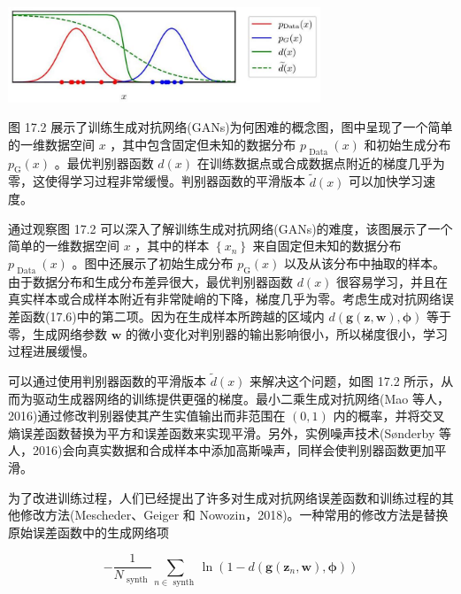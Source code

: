 \documentclass[10pt]{report}
\begin{document}
\begin{center}
\includegraphics[max width=0.7\textwidth]{images/0194e279-9b28-703a-88f4-c3ac21e2010d_556_553_347_918_280_0.jpg}
\end{center}
\hspace*{3em} 

图 17.2 展示了训练生成对抗网络(GANs)为何困难的概念图，图中呈现了一个简单的一维数据空间 \(x\) ，其中包含固定但未知的数据分布 \({p}_{\text{ Data }}\left( x\right)\) 和初始生成分布 \({p}_{\mathrm{G}}\left( x\right)\) 。最优判别器函数 \(d\left( x\right)\) 在训练数据点或合成数据点附近的梯度几乎为零，这使得学习过程非常缓慢。判别器函数的平滑版本 \(\widetilde{d}\left( x\right)\) 可以加快学习速度。

通过观察图 17.2 可以深入了解训练生成对抗网络(GANs)的难度，该图展示了一个简单的一维数据空间 \(x\) ，其中的样本 \(\left\{  {x}_{n}\right\}\) 来自固定但未知的数据分布 \({p}_{\text{ Data }}\left( x\right)\) 。图中还展示了初始生成分布 \({p}_{\mathrm{G}}\left( x\right)\) 以及从该分布中抽取的样本。由于数据分布和生成分布差异很大，最优判别器函数 \(d\left( x\right)\) 很容易学习，并且在真实样本或合成样本附近有非常陡峭的下降，梯度几乎为零。考虑生成对抗网络误差函数(17.6)中的第二项。因为在生成样本所跨越的区域内 \(d\left( {\mathbf{g}\left( {\mathbf{z},\mathbf{w}}\right) ,\mathbf{\phi }}\right)\) 等于零，生成网络参数 \(\mathbf{w}\) 的微小变化对判别器的输出影响很小，所以梯度很小，学习过程进展缓慢。

可以通过使用判别器函数的平滑版本 \(\widetilde{d}\left( x\right)\) 来解决这个问题，如图 17.2 所示，从而为驱动生成器网络的训练提供更强的梯度。最小二乘生成对抗网络(Mao 等人，2016)通过修改判别器使其产生实值输出而非范围在 \(\left( {0,1}\right)\) 内的概率，并将交叉熵误差函数替换为平方和误差函数来实现平滑。另外，实例噪声技术(Sønderby 等人，2016)会向真实数据和合成样本中添加高斯噪声，同样会使判别器函数更加平滑。

为了改进训练过程，人们已经提出了许多对生成对抗网络误差函数和训练过程的其他修改方法(Mescheder、Geiger 和 Nowozin，2018)。一种常用的修改方法是替换原始误差函数中的生成网络项

\[
- \frac{1}{{N}_{\text{ synth }}}\mathop{\sum }\limits_{{n \in  \text{ synth }}}\ln \left( {1 - d\left( {\mathbf{g}\left( {{\mathbf{z}}_{n},\mathbf{w}}\right) ,\mathbf{\phi }}\right) }\right)  \tag{17.9}
\]
\end{document}

